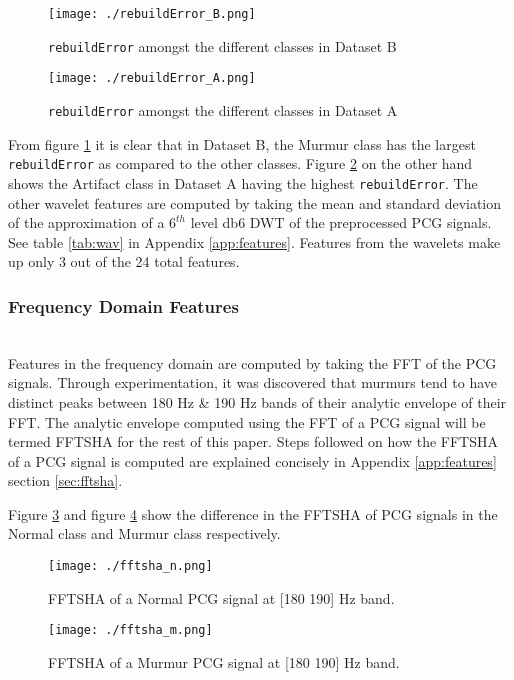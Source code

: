 \documentclass[10pt,twocolumn]{witseiepaper}
\begin{document}
\begin{figure}[h!]
    \centering
    \texttt{[image: ./rebuildError\_B.png]}
    \caption{\texttt{rebuildError} amongst the different classes in Dataset B}
    \label{fig:dbb}
\end{figure}

\begin{figure}[h!]
    \centering
    \texttt{[image: ./rebuildError\_A.png]}
    \caption{\texttt{rebuildError} amongst the different classes in Dataset A}
    \label{fig:dba}
\end{figure}

From figure \ref{fig:dbb} it is clear that in Dataset B, the Murmur class has the largest \texttt{rebuildError} as compared to the other classes. Figure \ref{fig:dba} on the other hand shows the Artifact class in Dataset A having the highest \texttt{rebuildError}. The other wavelet features are computed by taking the mean and standard deviation of the approximation of a $6^{th}$ level db6 DWT of the preprocessed PCG signals. See table \ref{tab:wav} in Appendix \ref{app:features}. Features from the wavelets make up only 3 out of the 24 total features.


\subsubsection{Frequency Domain Features}
\textcolor{white}{Ke ea ipitsang Jehova...}\\
Features in the frequency domain are computed by taking the FFT of the PCG signals. Through experimentation, it was discovered that murmurs tend to have distinct peaks between 180 Hz \& 190 Hz bands of their analytic envelope of their FFT. The analytic envelope computed using the FFT of a PCG signal will be termed FFTSHA for the rest of this paper. Steps followed on how the FFTSHA of a PCG signal is computed are explained concisely in Appendix \ref{app:features} section \ref{sec:fftsha}. 

Figure \ref{fig:n180} and figure \ref{fig:m180} show the difference in the FFTSHA of PCG signals in the Normal class and Murmur class respectively.

\begin{figure}[h!]
    \centering
    \texttt{[image: ./fftsha\_n.png]}
    \caption{FFTSHA of a Normal PCG signal at [180 190] Hz band.}
    \label{fig:n180}
\end{figure}

\begin{figure}[h!]
    \centering
    \texttt{[image: ./fftsha\_m.png]}
    \caption{FFTSHA of a Murmur PCG signal at [180 190] Hz band.}
    \label{fig:m180}
\end{figure}
\end{document}
